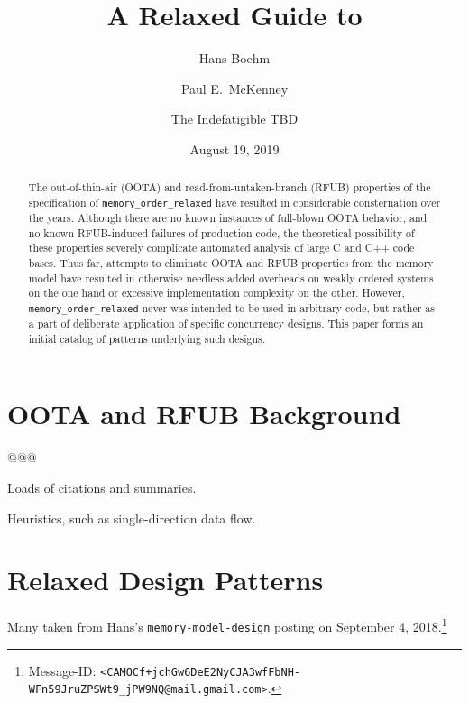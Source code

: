 \documentclass[10]{article}
\begin{document}
\title{A Relaxed Guide to }

\newcommand{\co}[1]{\lstinline[breaklines=yes,breakatwhitespace=yes]{#1}}

\author{
Hans Boehm\\ \and
Paul E.~McKenney\\ \and
The Indefatigible TBD
}
\date{August 19, 2019}
\maketitle{}

\begin{abstract}
	The out-of-thin-air (OOTA) and read-from-untaken-branch (RFUB)
	properties of the specification of \co{memory_order_relaxed}
	have resulted in considerable consternation over the years.
	Although there are no known instances of full-blown OOTA
	behavior, and no known RFUB-induced failures of production code,
	the theoretical possibility of these properties severely
	complicate automated analysis of large C and C++ code bases.
	Thus far, attempts to eliminate OOTA and RFUB properties from
	the memory model have resulted in otherwise needless added
	overheads on weakly ordered systems on the one hand or
	excessive implementation complexity on the other.
	However, \co{memory_order_relaxed} never was intended to be used
	in arbitrary code, but rather as a part of deliberate application
	of specific concurrency designs.
	This paper forms an initial catalog of patterns underlying such
	designs.
\end{abstract}

\section{OOTA and RFUB Background}
\label{sec:OOTA and RFUB Background}

@@@

Loads of citations and summaries.

Heuristics, such as single-direction data flow.

\section{Relaxed Design Patterns}
\label{sec:Relaxed Design Patterns}

Many taken from Hans's \co{memory-model-design} posting on
September 4, 2018.\footnote{
	Message-ID: \co{<CAMOCf+jchGw6DeE2NyCJA3wfFbNH-WFn59JruZPSWt9_jPW9NQ@mail.gmail.com>}.}
\end{document}
